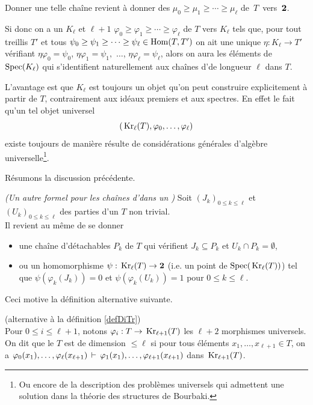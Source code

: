 Donner une telle chaîne revient à donner des \homos
$\mu_0\geq \mu_1\geq \cdots\geq  \mu_\ell$ de~$T$~vers~${\bf 2}$.

Si donc on a un \trdi $K_\ell$ et $\ell+1$ \homos
$\varphi_0\geq \varphi_1\geq \cdots\geq  \varphi_\ell$ de $T$ vers $K_\ell$ 
tels que, pour tout treillis $ T'$ et tous  
$\psi_0\geq \psi_1\geq \cdots\geq\psi_\ell\in{\rm Hom}(T,T')$
on ait une \homo unique  $\eta :K_\ell\rightarrow T'$  vérifiant 
$\eta\varphi_0=\psi_0$,
$\eta \varphi_1=\psi_1,$ $\ldots$,  $\eta \varphi_\ell=\psi_\ell$, 
alors on aura les éléments de ${\rm Spec}(K_\ell)$ qui s'identifient 
naturellement aux chaînes d'\ideps de longueur $\ell$ dans $T$.

L'avantage est que $K_\ell$ est toujours un objet qu'on peut construire
explicitement à partir de $T$, contrairement aux idéaux premiers et
aux spectres.
En effet le fait qu'un tel objet universel  
$$
(\,{\rm Kr}_\ell(T),\varphi_0, \dots,  \varphi_\ell)
$$ 
existe toujours de manière
\cov résulte de considérations générales d'algèbre
universelle\footnote{Ou encore de la description des problèmes universels qui admettent une solution dans la théorie des structures de Bourbaki.}.

Résumons la discussion précédente.

\begin{lemma} \label{lemKrJoyal} {\em (Un autre \nst formel pour les chaînes
d'\ideps dans un \trdi)}
Soit $(J_k)_{0\leq k\leq \ell}$ et $(U_k)_{0\leq k\leq \ell}$ des parties d'un \trdi $T$ non trivial. \\
Il revient au même de se donner 
\begin{itemize}
%
\item une chaîne d'\ideps détachables $P_k$ de $T$
qui vérifient $J_k\subseteq P_k$ et $U_k\cap P_k=\emptyset$,
%
\item ou un homomorphisme  $\psi:\,{\rm Kr}_\ell(T)\to {\bf 2}$ (i.e. un point de ${\rm Spec}(\,{\rm Kr}_\ell(T))$) tel que \hbox{$\psi(\varphi_k(J_k))=0$} et $\psi(\varphi_k(U_k))=1$ pour $0\leq k\leq \ell$. 
%
\end{itemize}
\end{lemma}

Ceci motive la définition \cov alternative suivante.

\begin{defa} \label{defDiTr2} (alternative à la définition \ref{defDiTr})
\\
{\rm Pour $0\leq i\leq \ell+1$, notons $\varphi_i:T\to \,{\rm Kr}_{\ell+1}(T)$  les $\ell+2$ morphismes universels.
\\
On dit que le \trdi $T$ est de dimension $\leq \ell$ si pour tous éléments \hbox{$x_1,\dots,x_{\ell+1}\in T$}, on a
$
\varphi_0(x_1),\dots,\varphi_{\ell}(x_{\ell+1})
\,\vdash\,
\varphi_1(x_1),\dots,\varphi_{\ell+1}(x_{\ell+1})
$
dans $\,{\rm Kr}_{\ell+1}(T)$. 
}
\end{defa}

